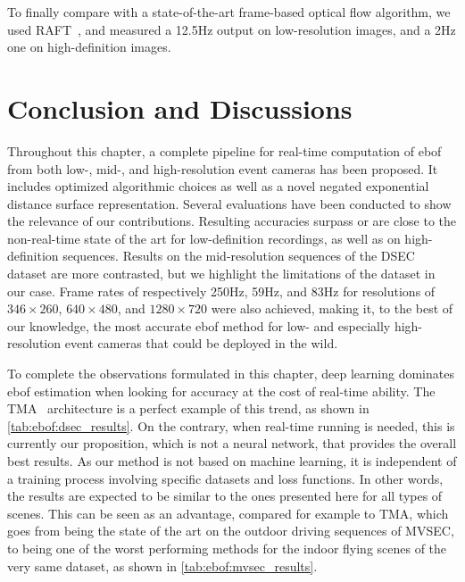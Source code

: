 To finally compare with a state-of-the-art frame-based optical flow algorithm, we used RAFT~\cite{Teed2020RAFTRA}, and measured a 12.5Hz output on low-resolution images, and a 2Hz one on high-definition images.


\section{Conclusion and Discussions}\label{sec:ebof:conclusion}
Throughout this chapter, a complete pipeline for real-time computation of \acrlong{ebof} from both low-, mid-, and high-resolution event cameras has been proposed. It includes optimized algorithmic choices as well as a novel negated exponential distance surface representation. Several evaluations have been conducted to show the relevance of our contributions. Resulting accuracies surpass or are close to the non-real-time state of the art for low-definition recordings, as well as on high-definition sequences. Results on the mid-resolution sequences of the DSEC dataset are more contrasted, but we highlight the limitations of the dataset in our case. Frame rates of respectively 250Hz, 59Hz, and 83Hz for resolutions of \(346\times260\), \(640\times480\), and \(1280\times720\) were also achieved, making it, to the best of our knowledge, the most accurate \acrshort{ebof} method for low- and especially high-resolution event cameras that could be deployed in the wild.

To complete the observations formulated in this chapter, deep learning dominates \acrshort{ebof} estimation when looking for accuracy at the cost of real-time ability. The TMA~\cite{Liu2023TMATM} architecture is a perfect example of this trend, as shown in \cref{tab:ebof:dsec_results}. On the contrary, when real-time running is needed, this is currently our proposition, which is not a neural network, that provides the overall best results. As our method is not based on machine learning, it is independent of a training process involving specific datasets and loss functions. In other words, the results are expected to be similar to the ones presented here for all types of scenes. This can be seen as an advantage, compared for example to TMA, which goes from being the state of the art on the outdoor driving sequences of MVSEC, to being one of the worst performing methods for the indoor flying scenes of the very same dataset, as shown in \cref{tab:ebof:mvsec_results}.


